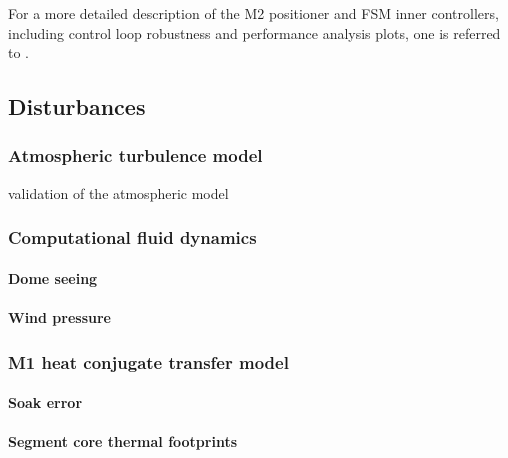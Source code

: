 \documentclass{gmto}
\begin{document}
For a more detailed description of the M2 positioner and FSM inner controllers, including control loop robustness and performance analysis plots, one is referred to \cite[Section 4.1 and 4.2]{GMT.DOC.05154}.



\clearpage
\subsection{Disturbances}
\label{sec:disturbances}

\subsubsection{Atmospheric turbulence model}
\label{sec:atm}

validation of the atmospheric model\cite{GMT.DOC.01862}


\subsubsection{Computational fluid dynamics}
\label{sec:cfd}

\paragraph{Dome seeing}

\paragraph{Wind pressure}

\cite{GMTO.DOC.03352}

\subsubsection{M1 heat conjugate transfer model}
\label{sec:m1-hct}

\cite{GMT.DOC.04558,GMT.DOC.04557,GMT.DOC.04894}
\paragraph{Soak error}

\paragraph{Segment core thermal footprints}



\clearpage

\printbibliography
\end{document}
